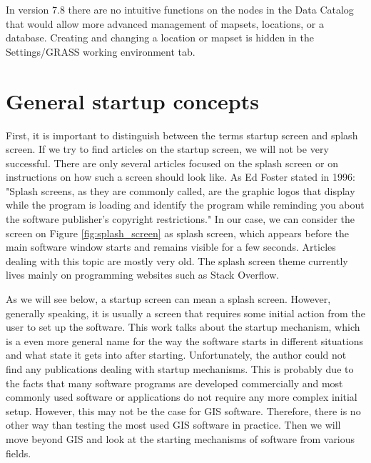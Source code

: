 \documentclass[a4paper,10pt,twoside]{article}
\begin{document}
In version 7.8 there are no intuitive functions on the nodes in the Data Catalog that would allow more advanced management of mapsets, locations, or a database. Creating and changing a location or mapset is hidden in the Settings/GRASS working environment tab.


\newpage
\vspace*{-1cm}
\section{General startup concepts}
\noindent
\large

\noindent First, it is important to distinguish between the terms startup screen and splash screen. If we try to find articles on the startup screen, we will not be very successful. There are only several articles focused on the splash screen or on instructions on how such a screen should look like. As Ed Foster stated in 1996: "Splash screens, as they are commonly called, are the graphic logos that display while the program is loading and identify the program while reminding you about the software publisher's copyright restrictions." In our case, we can consider the screen on Figure \ref{fig:splash_screen} as splash screen, which appears before the main software window starts and remains visible for a few seconds. Articles dealing with this topic are mostly very old. The splash screen theme currently lives mainly on programming websites such as Stack Overflow.

As we will see below, a startup screen can mean a splash screen. However, generally speaking, it is usually a screen that requires some initial action from the user to set up the software. This work talks about the startup mechanism, which is a even more general name for the way the software starts in different situations and what state it gets into after starting. Unfortunately, the author could not find any publications dealing with startup mechanisms. This is probably due to the facts that many software programs are developed commercially and most commonly used software or applications do not require any more complex initial setup. However, this may not be the case for GIS software. Therefore, there is no other way than testing the most used GIS software in practice. Then we will move beyond GIS and look at the starting mechanisms of software from various fields.
\end{document}
